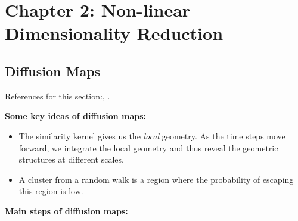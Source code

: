 \chapter{Chapter 2: Non-linear Dimensionality Reduction} 
\label{Chapter2} 

\section{Diffusion Maps}
References for this section:\cite{coifman_geometric_2005}, \cite{coifman_diffusion_2006}.
\par \textbf{Some key ideas of diffusion maps: }
\begin{itemize}
    \item The similarity kernel gives us the \textit{local} geometry. As the time steps move forward, we integrate the local geometry and thus reveal the geometric structures at different scales. 
    \item A cluster from a random walk is a region where the probability of escaping this region is low.
\end{itemize}
\par \textbf{Main steps of diffusion maps: }

